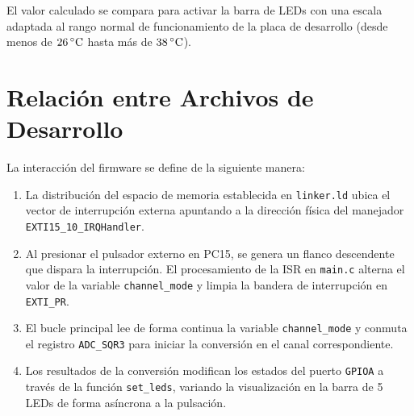 El valor calculado se compara para activar la barra de LEDs con una escala adaptada al rango normal de funcionamiento
de la placa de desarrollo (desde menos de $26\,^\circ\mathrm{C}$ hasta más de $38\,^\circ\mathrm{C}$).

\section{Relación entre Archivos de Desarrollo}
\label{sec.ej2:relacion}

La interacción del firmware se define de la siguiente manera:
\begin{enumerate}
    \item La distribución del espacio de memoria establecida en \texttt{linker.ld} ubica el vector de interrupción
    externa apuntando a la dirección física del manejador \texttt{EXTI15\_10\_}\allowbreak\texttt{IRQHandler}.
    \item Al presionar el pulsador externo en PC15, se genera un flanco descendente que dispara la interrupción. El
    procesamiento de la ISR en \texttt{main.c} alterna el valor de la variable \texttt{channel\_mode} y limpia
    la bandera de interrupción en \texttt{EXTI\_PR}.
    \item El bucle principal lee de forma continua la variable \texttt{channel\_mode} y conmuta el registro
    \texttt{ADC\_SQR3} para iniciar la conversión en el canal correspondiente.
    \item Los resultados de la conversión modifican los estados del puerto \texttt{GPIOA} a través de la función
    \texttt{set\_leds}, variando la visualización en la barra de 5 LEDs de forma asíncrona a la pulsación.
\end{enumerate}
